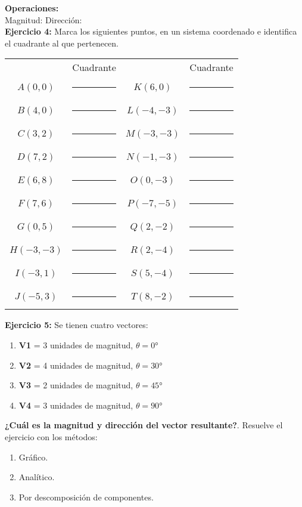 \documentclass[12pt]{article}
\begin{document}
\textbf{Operaciones:}
\\[1em]
Magnitud: \hspace{7cm} Dirección: 
\vspace{4cm}
\\[1em]
\textbf{Ejercicio 4: } Marca los siguientes puntos, en un sistema coordenado e identifica el cuadrante al que pertenecen.
\begin{table}[H]
\centering
\begin{tabular}{c c c c }
 & Cuadrante & & Cuadrante \\
$A (0, 0)$ & \rule{1cm}{0.6pt} & $K (6, 0)$ & \rule{1cm}{0.6pt}  \\
$B (4, 0)$ & \rule{1cm}{0.6pt} & $L (-4, -3)$ & \rule{1cm}{0.6pt} \\
$C (3, 2)$ & \rule{1cm}{0.6pt} & $M (-3, -3)$ & \rule{1cm}{0.6pt} \\
$D (7, 2)$ & \rule{1cm}{0.6pt} & $N (-1, -3)$ & \rule{1cm}{0.6pt} \\
$E (6, 8)$ & \rule{1cm}{0.6pt} & $O (0, -3)$ & \rule{1cm}{0.6pt} \\
$F (7, 6)$ & \rule{1cm}{0.6pt} & $P (-7, -5)$ & \rule{1cm}{0.6pt} \\
$G (0, 5)$ & \rule{1cm}{0.6pt} & $Q (2, -2)$ & \rule{1cm}{0.6pt} \\
$H (-3, -3)$ & \rule{1cm}{0.6pt} & $R (2, -4)$ & \rule{1cm}{0.6pt} \\
$I (-3, 1)$ & \rule{1cm}{0.6pt} & $S (5, -4)$ & \rule{1cm}{0.6pt} \\
$J (-5, 3)$ & \rule{1cm}{0.6pt} & $T (8, -2)$ & \rule{1cm}{0.6pt} \\
\end{tabular}
\end{table}

\newpage
\textbf{Ejercicio 5: } Se tienen cuatro vectores:
\begin{enumerate}
\item \textbf{V1} = 3 unidades de magnitud, $\theta = \ang{0}$
\item \textbf{V2} = 4 unidades de magnitud, $\theta = \ang{30}$
\item \textbf{V3} = 2 unidades de magnitud, $\theta = \ang{45}$
\item \textbf{V4} = 3 unidades de magnitud, $\theta = \ang{90}$
\end{enumerate}
\textbf{¿Cuál es la magnitud y dirección del vector resultante?}. Resuelve el ejercicio con los métodos:
\begin{enumerate}
\item Gráfico.
\item Analítico.
\item Por descomposición de componentes.
\end{enumerate}
\begin{figure}[H]
	\centering
\end{figure}
\end{document}
